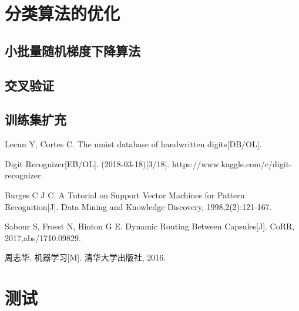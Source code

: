 \documentclass[forprint]{WHUBachelor}
\begin{document}
     \chapter{分类算法的优化}
     
       \section{小批量随机梯度下降算法}
       
       
       
       \section{交叉验证}
       
       
       \section{训练集扩充}
   
   
   \cleardoublepage{}
   \begin{thebibliography}{00}
   
      Lecun Y, Cortes C. The mnist database of handwritten digits[DB/OL]. 
   
      Digit Recognizer[EB/OL]. (2018-03-18)[3/18]. https://www.kaggle.com/c/digit-recognizer.
   
      Burges C J C. A Tutorial on Support Vector Machines for Pattern Recognition[J]. Data Mining and Knowledge Discovery, 1998,2(2):121-167.
   
      Sabour S, Frosst N, Hinton G E. Dynamic Routing Between Capsules[J]. CoRR, 2017,abs/1710.09829.
   
      周志华. 机器学习[M]. 清华大学出版社, 2016.
   \end{thebibliography}
   
   
   \appendix
   
   \chapter{测试}
   
\end{document}
